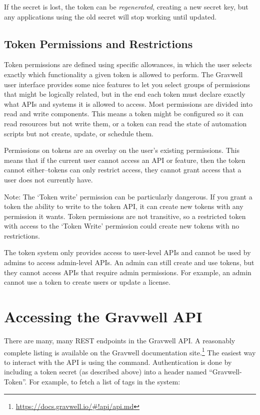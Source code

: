 If the secret is lost, the token can be \emph{regenerated}, creating a new secret key, but any applications using the old secret will stop working until updated.

\subsection{Token Permissions and Restrictions}

Token permissions are defined using specific allowances, in which the user selects exactly which functionality a given token is allowed to perform.  The Gravwell user interface provides some nice features to let you select groups of permissions that might be logically related, but in the end each token must declare exactly what APIs and systems it is allowed to access.  Most permissions are divided into read and write components.  This means a token might be configured so it can read resources but not write them, or a token can read the state of automation scripts but not create, update, or schedule them.

Permissions on tokens are an overlay on the user's existing permissions.  This means that if the current user cannot access an API or feature, then the token cannot either--tokens can only restrict access, they cannot grant access that a user does not currently have.

Note: The `Token write' permission can be particularly dangerous. If you grant a token the ability to write to the token API, it can create new tokens with any permission it wants.  Token permissions are not transitive, so a restricted token with access to the `Token Write' permission could create new tokens with no restrictions.

The token system only provides access to user-level APIs and cannot be used by admins to access admin-level APIs.  An admin can still create and use tokens, but they cannot access APIs that require admin permissions.  For example, an admin cannot use a token to create users or update a license.

\section{Accessing the Gravwell API}

There are many, many REST endpoints in the Gravwell API. A reasonably complete listing is available on the Gravwell documentation site.\footnote{\href{https://docs.gravwell.io/\#!api/api.md}{https://docs.gravwell.io/\#!api/api.md}} The easiest way to interact with the API is using the  command. Authentication is done by including a token secret (as described above) into a header named ``Gravwell-Token''. For example, to fetch a list of tags in the system:

